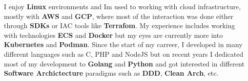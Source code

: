 

%
\begin{cventries}

  \cventry
  {}
  {}
  {}
  {}
    { I enjoy \textbf{Linux} environments and Im used to working with cloud infrastructure, mostly with \textbf{AWS} and \textbf{GCP}, where most of the interaction was done either through \textbf{SDKs} or IAC tools like \textbf{Terrafom}. My experience includes working with technologies \textbf{ECS} and \textbf{Docker} but my eyes are currently more into \textbf{Kubernetes} and \textbf{Podman}. Since the start of my carreer, I developed in many different languages such as C, PHP and NodeJS but on recent years I dedicated most of my development to \textbf{Golang} and \textbf{Python} and got interested in different \textbf{Software Archictecture} paradigms such as \textbf{DDD}, \textbf{Clean Arch}, etc.}
\end{cventries}

